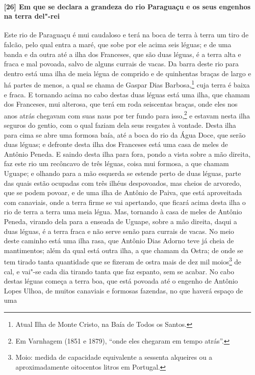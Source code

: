 \paragraph{[26] Em que se declara a grandeza do rio Paraguaçu e os seus engenhos na terra
del"-rei}\quad
Este rio de Paraguaçu é mui caudaloso e terá na boca de terra à terra um tiro de falcão,
pelo qual entra a maré, que sobe por ele acima seis léguas; e de uma banda e da outra até
a ilha dos Franceses, que são duas léguas, é a terra alta e fraca e mal povoada, salvo de
alguns currais de vacas. Da barra deste rio para dentro está uma ilha de meia légua de
comprido e de quinhentas braças de largo e há partes de menos, a qual se chama de Gaspar
Dias Barbosa,\footnote{ Atual Ilha de Monte Cristo, na Baía de Todos os Santos.} cuja
terra é baixa e fraca. E tornando acima no cabo destas duas léguas está uma ilha, que
chamam dos Franceses, mui alterosa, que terá em roda seiscentas braças, onde eles nos anos
atrás chegavam com suas naus por ter fundo para isso,\footnote{ Em Varnhagem (1851 e
1879), ``onde eles chegaram em tempo atrás''.} e estavam nesta ilha seguros do gentio, com
o qual faziam dela seus resgates à vontade. Desta ilha para cima se abre uma formosa baía,
até a boca do rio da Água Doce, que serão duas léguas; e defronte desta ilha dos Franceses
está uma casa de meles de Antônio Peneda. E saindo desta ilha para fora, pondo a vista
sobre a mão direita, faz este rio um recôncavo de três léguas, coisa mui formosa, a que
chamam Uguape; e olhando para a mão esquerda se estende perto de duas léguas, parte das
quais estão ocupadas com três ilhéus despovoados, mas cheios de arvoredo, que se podem
povoar, e de uma ilha de Antônio de Paiva, que está aproveitada com canaviais, onde a
terra firme se vai apertando, que ficará acima desta ilha o rio de terra a terra uma meia
légua. Mas, tornando à casa de meles de Antônio Peneda, virando dela para a enseada de
Uguape, sobre a mão direita, daqui a duas léguas, é a terra fraca e não serve senão para
currais de vacas. No meio deste caminho está uma ilha rasa, que Antônio Dias Adorno teve
já cheia de mantimentos; além da qual está outra ilha, a que chamam da Ostra; de onde se
tem tirado tanta quantidade que se fizeram de ostra mais de dez mil moios\footnote{ Moio:
medida de capacidade equivalente a sessenta alqueires ou a aproximadamente oitocentos
litros em Portugal.} de cal, e vai"-se cada dia tirando tanta que faz espanto, sem se
acabar. No cabo destas léguas começa a terra boa, que está povoada até o engenho de
Antônio Lopes Ulhoa, de muitos canaviais e formosas fazendas, no que haverá espaço de uma
